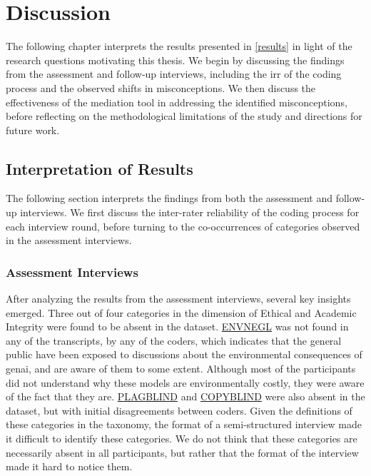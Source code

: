 \chapter{Discussion}\label{discussion}
The following chapter interprets the results presented in \autoref{results} in light of the research questions motivating this thesis. We begin by discussing the findings from the assessment and follow-up interviews, including the \acrfull{irr} of the coding process and the observed shifts in misconceptions. We then discuss the effectiveness of the mediation tool in addressing the identified misconceptions, before reflecting on the methodological limitations of the study and directions for future work.

\section{Interpretation of Results}
The following section interprets the findings from both the assessment and follow-up interviews. We first discuss the inter-rater reliability of the coding process for each interview round, before turning to the co-occurrences of categories observed in the assessment interviews.
\subsection*{Assessment Interviews}
After analyzing the results from the assessment interviews, several key insights emerged. Three out of four categories in the dimension of Ethical and Academic Integrity were found to be absent in the dataset. \hyperref[envnegl]{ENVNEGL} was not found in any of the transcripts, by any of the coders, which indicates that the general public have been exposed to discussions about the environmental consequences of \gls{genai}, and are aware of them to some extent. Although most of the participants did not understand why these models are environmentally costly, they were aware of the fact that they are. 
\hyperref[plagblind]{PLAGBLIND} and \hyperref[copyblind]{COPYBLIND} were also absent in the dataset, but with initial disagreements between coders. Given the definitions of these categories in the taxonomy, the format of a semi-structured interview made it difficult to identify these categories. We do not think that these categories are necessarily absent in all participants, but rather that the format of the interview made it hard to notice them.

